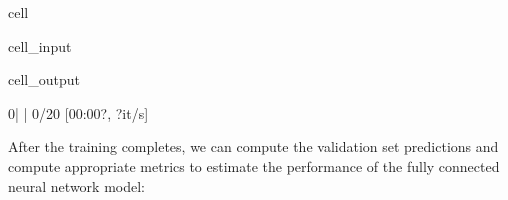 \documentclass[letterpaper,10pt,english]{jupyterBook}
\begin{document}
\begin{sphinxuseclass}{cell}
\begin{sphinxVerbatimInput}
\begin{sphinxuseclass}{cell_input}
\begin{sphinxVerbatim}[commandchars=\\\{\}]
\end{sphinxVerbatim}

\end{sphinxuseclass}\end{sphinxVerbatimInput}
\begin{sphinxVerbatimOutput}

\begin{sphinxuseclass}{cell_output}
\begin{sphinxVerbatim}[commandchars=\\\{\}]
  0\PYGZpc{}|          | 0/20 [00:00\PYGZlt{}?, ?it/s]
\end{sphinxVerbatim}

\end{sphinxuseclass}\end{sphinxVerbatimOutput}

\end{sphinxuseclass}
\sphinxAtStartPar
{}

\sphinxAtStartPar
After the training completes, we can compute the validation set predictions and compute appropriate metrics to estimate the performance of the fully connected neural network model:
\end{document}
